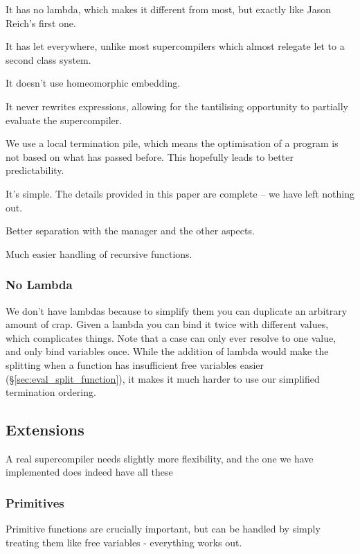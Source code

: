 \documentclass[draft]{sigplanconf}
\begin{document}
It has no lambda, which makes it different from most, but exactly like Jason Reich's first one.

It has let everywhere, unlike most supercompilers which almost relegate let to a second class system.

It doesn't use homeomorphic embedding.

It never rewrites expressions, allowing for the tantilising opportunity to partially evaluate the supercompiler.

We use a local termination pile, which means the optimisation of a program is not based on what has passed before. This hopefully leads to better predictability.

It's simple. The details provided in this paper are complete -- we have left nothing out.

Better separation with the manager and the other aspects.

Much easier handling of recursive functions.

\subsubsection{No Lambda}
\label{sec:nolambda}

We don't have lambdas because to simplify them you can duplicate an arbitrary amount of crap. Given a lambda you can bind it twice with different values, which complicates things. Note that a case can only ever resolve to one value, and only bind variables once. While the addition of lambda would make the splitting when a function has insufficient free variables easier (\S\ref{sec:eval_split_function}), it makes it much harder to use our simplified termination ordering.

\subsection{Extensions}
\label{sec:extensions}

A real supercompiler needs slightly more flexibility, and the one we have implemented does indeed have all these

\subsubsection{Primitives}

Primitive functions are crucially important, but can be handled by simply treating them like free variables - everything works out.
\end{document}
